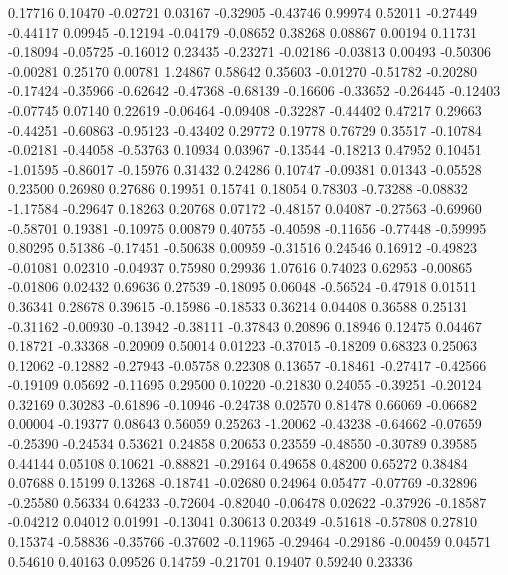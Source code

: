    0.17716  0.10470
  -0.02721  0.03167
  -0.32905 -0.43746
   0.99974  0.52011
  -0.27449 -0.44117
   0.09945 -0.12194
  -0.04179 -0.08652
   0.38268  0.08867
   0.00194  0.11731
  -0.18094 -0.05725
  -0.16012  0.23435
  -0.23271 -0.02186
  -0.03813  0.00493
  -0.50306 -0.00281
   0.25170  0.00781
   1.24867  0.58642
   0.35603 -0.01270
  -0.51782 -0.20280
  -0.17424 -0.35966
  -0.62642 -0.47368
  -0.68139 -0.16606
  -0.33652 -0.26445
  -0.12403 -0.07745
   0.07140  0.22619
  -0.06464 -0.09408
  -0.32287 -0.44402
   0.47217  0.29663
  -0.44251 -0.60863
  -0.95123 -0.43402
   0.29772  0.19778
   0.76729  0.35517
  -0.10784 -0.02181
  -0.44058 -0.53763
   0.10934  0.03967
  -0.13544 -0.18213
   0.47952  0.10451
  -1.01595 -0.86017
  -0.15976  0.31432
   0.24286  0.10747
  -0.09381  0.01343
  -0.05528  0.23500
   0.26980  0.27686
   0.19951  0.15741
   0.18054  0.78303
  -0.73288 -0.08832
  -1.17584 -0.29647
   0.18263  0.20768
   0.07172 -0.48157
   0.04087 -0.27563
  -0.69960 -0.58701
   0.19381 -0.10975
   0.00879  0.40755
  -0.40598 -0.11656
  -0.77448 -0.59995
   0.80295  0.51386
  -0.17451 -0.50638
   0.00959 -0.31516
   0.24546  0.16912
  -0.49823 -0.01081
   0.02310 -0.04937
   0.75980  0.29936
   1.07616  0.74023
   0.62953 -0.00865
  -0.01806  0.02432
   0.69636  0.27539
  -0.18095  0.06048
  -0.56524 -0.47918
   0.01511  0.36341
   0.28678  0.39615
  -0.15986 -0.18533
   0.36214  0.04408
   0.36588  0.25131
  -0.31162 -0.00930
  -0.13942 -0.38111
  -0.37843  0.20896
   0.18946  0.12475
   0.04467  0.18721
  -0.33368 -0.20909
   0.50014  0.01223
  -0.37015 -0.18209
   0.68323  0.25063
   0.12062 -0.12882
  -0.27943 -0.05758
   0.22308  0.13657
  -0.18461 -0.27417
  -0.42566 -0.19109
   0.05692 -0.11695
   0.29500  0.10220
  -0.21830  0.24055
  -0.39251 -0.20124
   0.32169  0.30283
  -0.61896 -0.10946
  -0.24738  0.02570
   0.81478  0.66069
  -0.06682  0.00004
  -0.19377  0.08643
   0.56059  0.25263
  -1.20062 -0.43238
  -0.64662 -0.07659
  -0.25390 -0.24534
   0.53621  0.24858
   0.20653  0.23559
  -0.48550 -0.30789
   0.39585  0.44144
   0.05108  0.10621
  -0.88821 -0.29164
   0.49658  0.48200
   0.65272  0.38484
   0.07688  0.15199
   0.13268 -0.18741
  -0.02680  0.24964
   0.05477 -0.07769
  -0.32896 -0.25580
   0.56334  0.64233
  -0.72604 -0.82040
  -0.06478  0.02622
  -0.37926 -0.18587
  -0.04212  0.04012
   0.01991 -0.13041
   0.30613  0.20349
  -0.51618 -0.57808
   0.27810  0.15374
  -0.58836 -0.35766
  -0.37602 -0.11965
  -0.29464 -0.29186
  -0.00459  0.04571
   0.54610  0.40163
   0.09526  0.14759
  -0.21701  0.19407
   0.59240  0.23336
